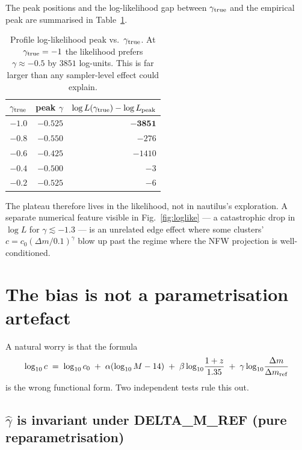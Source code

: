 \documentclass[11pt,a4paper]{article}
\newcommand{\gtrue}{\gamma_{\rm true}}
\newcommand{\ghat}{\hat\gamma}
\newcommand{\dm}{\Delta m}
\newcommand{\dmref}{\Delta m_{\rm ref}}
\begin{document}
The peak positions and the log-likelihood gap between $\gtrue$ and the empirical
peak are summarised in Table~\ref{tab:loglike}.

\begin{table}[htbp]
  \centering
  \begin{tabular}{rrr}
    \toprule
    $\gtrue$ & peak $\gamma$ & $\log L(\gtrue) - \log L_{\rm peak}$\\
    \midrule
    $-1.0$ & $-0.525$ & $\mathbf{-3851}$\\
    $-0.8$ & $-0.550$ & $-276$\\
    $-0.6$ & $-0.425$ & $-1410$\\
    $-0.4$ & $-0.500$ & $-3$\\
    $-0.2$ & $-0.525$ & $-6$\\
    \bottomrule
  \end{tabular}
  \caption{Profile log-likelihood peak vs.\ $\gtrue$.  At $\gtrue = -1$ the
  likelihood prefers $\gamma \approx -0.5$ by $3851$ log-units. This is far
  larger than any sampler-level effect could explain.}
  \label{tab:loglike}
\end{table}

\noindent The plateau therefore lives in the likelihood, not in nautilus's
exploration.  A separate numerical feature visible in
Fig.~\ref{fig:loglike} --- a catastrophic drop in $\log L$ for
$\gamma \lesssim -1.3$ --- is an unrelated edge effect where some clusters'
$c = c_0 (\dm/0.1)^\gamma$ blow up past the regime where the NFW projection is
well-conditioned.

\section{The bias is not a parametrisation artefact}

A natural worry is that the formula
\begin{equation}
  \log_{10} c \;=\; \log_{10} c_0
  \;+\; \alpha (\log_{10} M - 14)
  \;+\; \beta \log_{10}\!\frac{1+z}{1.35}
  \;+\; \gamma \log_{10}\!\frac{\dm}{\dmref}
  \label{eq:cmodel}
\end{equation}
is the wrong functional form.  Two independent tests rule this out.

\subsection{$\ghat$ is invariant under DELTA\_M\_REF (pure reparametrisation)}
\end{document}
